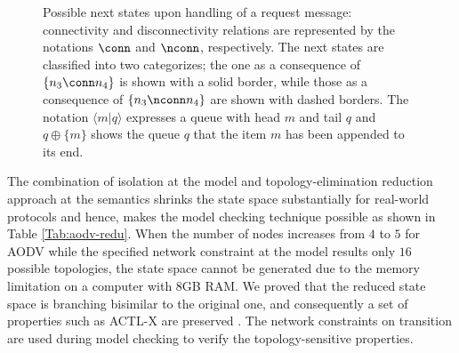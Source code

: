 \begin{figure}
	\caption{Possible next states upon handling of a request message: connectivity and disconnectivity relations are represented by the notations $\conn $ and $\nconn$, respectively. The next states are classified into two categorizes; the one as a consequence of $\{n_3\conn n_4\}$ is shown with a solid border, while those as a consequence of $\{n_3\nconn n_4\}$ are shown with dashed borders. The notation $\langle m|q\rangle$ expresses a queue with head $m$ and tail $q$ and $q\oplus\{m\}$ shows the queue $q$ that the item $m$ has been appended to its end.}\label{Fig::reduction}
\end{figure}
%
The combination of isolation at the model and topology-elimination reduction approach at the semantics shrinks the state space substantially for real-world protocols and hence, makes the model checking technique possible as shown in Table \ref{Tab:aodv-redu}. When the number of nodes increases from $4$ to $5$ for AODV while the specified network constraint at the model results only $16$ possible topologies, the state space cannot be generated due to the memory limitation on a computer with $8${GB} {RAM}.  We proved that the reduced state space is branching bisimilar to the
original one, and consequently a set of properties such as {ACTL-X} are preserved \cite{FOAC}. The network constraints on transition are used during model checking \cite{FORM,CSI2018} to verify the topology-sensitive properties. 

